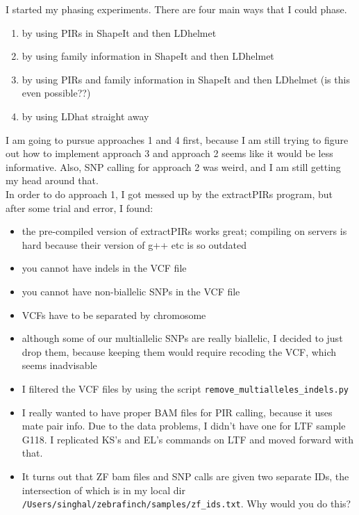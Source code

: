 \documentclass[idxtotoc,hyperref,openany,oneside]{labbook} %
\begin{document}

I started my phasing experiments. There are four main ways that I could phase. 
\begin{enumerate}
\item by using PIRs in ShapeIt and then LDhelmet
\item by using family information in ShapeIt and then LDhelmet
\item by using PIRs and family information in ShapeIt and then LDhelmet (is this even possible??)
\item by using LDhat straight away
\end{enumerate}

I am going to pursue approaches 1 and 4 first, because I am still trying to figure out how to implement approach 3 and approach 2 seems like it would be less informative. Also, SNP calling for approach 2 was weird, and I am still getting my head around that. \\

In order to do approach 1, I got messed up by the extractPIRs program, but after some trial and error, I found:
\begin{itemize}
\item the pre-compiled version of extractPIRs works great; compiling on servers is hard because their version of g++ etc is so outdated
\item you cannot have indels in the VCF file
\item you cannot have non-biallelic SNPs in the VCF file
\item VCFs have to be separated by chromosome
\item although some of our multiallelic SNPs are really biallelic, I decided to just drop them, because keeping them would require recoding the VCF, which seems inadvisable
\item I filtered the VCF files by using the script \texttt{remove\_multialleles\_indels.py}
\item I really wanted to have proper BAM files for PIR calling, because it uses mate pair info. Due to the data problems, I didn't have one for LTF sample G118. I replicated KS's and EL's commands on LTF and moved forward with that.
\item It turns out that ZF bam files and SNP calls are given two separate IDs, the intersection of which is in my local dir \texttt{/Users/singhal/zebrafinch/samples/zf\_ids.txt}. Why would you do this?
\end{itemize}
\end{document}
